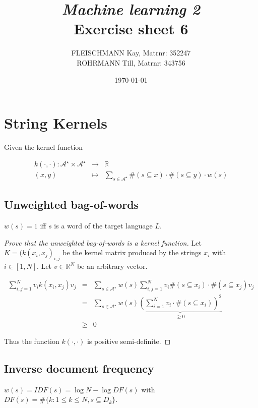 \documentclass[a4paper, 12pt, titlepage]{article}
\title
{{\em Machine learning 2}\\
Exercise sheet 6}
\author{FLEISCHMANN Kay, Matrnr: 352247\\
	ROHRMANN Till, Matrnr: 343756}
\date{\today}
\begin{document}
\maketitle

\section{String Kernels}

Given the kernel function

\begin{eqnarray*}
	k(\cdot,\cdot) : \mathcal{A}^{\star} \times \mathcal{A}^{\star} &\rightarrow& \mathbb{R}\\
	(x,y) &\mapsto& \sum_{s\in\mathcal{A}^{\star}} \#(s \subseteq x) \cdot \#(s\subseteq y) \cdot w(s)
\end{eqnarray*}

\subsection{Unweighted bag-of-words}
\label{section:bag}
$w(s)=1$ iff $s$ is a word of the target language $L$.

\begin{proof}[Prove that the unweighted bag-of-words is a kernel function]

Let $K=(k(x_i,x_j)_{i,j}$ be the kernel matrix produced by the strings $x_i$ with $i\in [1,N]$.
Let $v \in \mathbb{R}^{N}$ be an arbitrary vector.

\begin{eqnarray*}
	\sum_{i,j=1}^{N} v_i k(x_i,x_j) v_j &=& \sum_{s\in\mathcal{A}^\star} w(s) \sum_{i,j=1}^N v_i \#(s\subseteq x_i)\cdot \#(s\subseteq x_j) v_j \\
	&=& \sum_{s\in\mathcal{A}^\star} w(s) \underbrace{\left( \sum_{i=1}^N v_i \cdot \#(s\subseteq x_i) \right)^2}_{\ge 0} \\
	&\ge& 0
\end{eqnarray*}

Thus the function $k(\cdot,\cdot)$ is positive semi-definite.

\end{proof}

\subsection{Inverse document frequency}

$w(s) = IDF(s) = \log N - \log DF(s)$ with $DF(s) = \#\{k: 1\le k \le N, s\subseteq D_k\}$.
\end{document}
